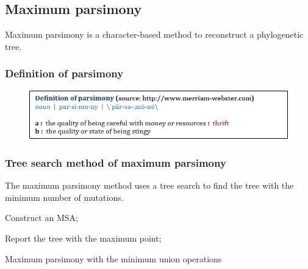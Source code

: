 %
%

%
%
\subsection{Maximum parsimony}
Maximum parsimony is a character-based method to reconstruct a phylogenetic tree. 

%
%
\subsubsection*{Definition of parsimony}
\begin{figure}[H]
  \centering
      \includegraphics[width=0.7 \textwidth]{fig09/parsimony.png}
\end{figure}

%
%
\subsubsection*{Tree search method of maximum parsimony}
The maximum parsimony method uses a tree search to find the tree with the minimum number of mutations. \\

\begin{algorithm}[H]    
  \BlankLine
  Construct an MSA;
  \BlankLine
    
  
  \BlankLine
  Report the tree with the maximum point;
   \BlankLine
    
  \caption{Maximum parsimony with the minimum union operations}

\end{algorithm}

